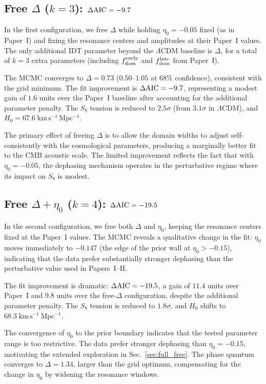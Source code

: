 \documentclass[aps,prd,twocolumn,superscriptaddress,nofootinbib]{revtex4-2}
\newcommand{\fdom}{f_{\rm dom}}
\newcommand{\Hubble}{H_0}
\newcommand{\dAIC}{\Delta{\rm AIC}}
\newcommand{\etaz}{\eta_0}
\begin{document}
\subsection{Free $\Delta$ ($k = 3$): $\dAIC = -9.7$}
\label{sec:free_delta}

In the first configuration, we free $\Delta$ while holding
$\etaz = -0.05$ fixed (as in Paper~I) and fixing the resonance
centers and amplitudes at their Paper~I values. The only additional
IDT parameter beyond the $\Lambda$CDM baseline is $\Delta$, for a
total of $k = 3$ extra parameters (including $\fdom^{\rm early}$ and
$\fdom^{\rm late}$ from Paper~I).

The MCMC converges to $\Delta = 0.73$ ($0.50$--$1.05$ at $68\%$
confidence), consistent with the grid minimum. The fit improvement is
$\dAIC = -9.7$, representing a modest gain of $1.6$ units over the
Paper~I baseline after accounting for the additional parameter penalty.
The $S_8$ tension is reduced to $2.5\sigma$ (from $3.1\sigma$ in
$\Lambda$CDM), and $\Hubble = 67.6\;\mathrm{km\,s^{-1}\,Mpc^{-1}}$.

The primary effect of freeing $\Delta$ is to allow the domain widths
to adjust self-consistently with the cosmological parameters,
producing a marginally better fit to the CMB acoustic scale. The
limited improvement reflects the fact that with $\etaz = -0.05$, the
dephasing mechanism operates in the perturbative regime where its
impact on $S_8$ is modest.

\subsection{Free $\Delta + \etaz$ ($k = 4$): $\dAIC = -19.5$}
\label{sec:free_delta_eta}

In the second configuration, we free both $\Delta$ and $\etaz$,
keeping the resonance centers fixed at the Paper~I values. The MCMC
reveals a qualitative change in the fit: $\etaz$ moves immediately to
$-0.147$ (the edge of the prior wall at $\etaz > -0.15$), indicating
that the data prefer substantially stronger dephasing than the
perturbative value used in Papers~I--II.

The fit improvement is dramatic: $\dAIC = -19.5$, a gain of $11.4$
units over Paper~I and $9.8$ units over the free-$\Delta$
configuration, despite the additional parameter penalty. The $S_8$
tension is reduced to $1.8\sigma$, and $\Hubble$ shifts to
$68.3\;\mathrm{km\,s^{-1}\,Mpc^{-1}}$.

The convergence of $\etaz$ to the prior boundary indicates that the
tested parameter range is too restrictive. The data prefer stronger
dephasing than $\etaz = -0.15$, motivating the extended exploration in
Sec.~\ref{sec:full_free}. The phase quantum converges to $\Delta =
1.34$, larger than the grid optimum, compensating for the change in
$\etaz$ by widening the resonance windows.
\end{document}
